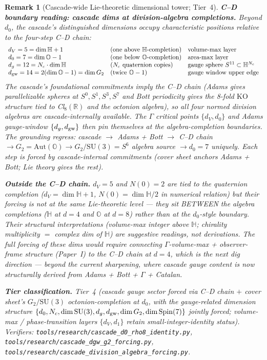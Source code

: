 \documentclass[12pt,a4paper]{article}
\newtheorem*{remark}{Remark}
\begin{document}
\begin{remark}[Cascade-wide Lie-theoretic dimensional tower; Tier~4]
\medskip\noindent\textbf{C--D boundary reading: cascade dims at division-algebra completions.} Beyond $d_0$, the cascade's distinguished dimensions occupy characteristic positions relative to the four-step C--D chain:
\[
\begin{array}{lll}
d_V = 5 = \dim\mathbb{H} + 1 & \text{(one above } \mathbb{H}\text{-completion)} & \text{volume-max layer}\\
d_0 = 7 = \dim\mathbb{O} - 1 & \text{(one below } \mathbb{O}\text{-completion)} & \text{area-max layer}\\
d_g = 12 = N_c \cdot \dim\mathbb{H} & \text{(} N_c \text{ quaternion copies)} & \text{gauge sphere $S^{11}\subset\mathbb{H}^{N_c}$}\\
d_{\rm gw} = 14 = 2(\dim\mathbb{O} - 1) = \dim G_2 & \text{(twice $\mathbb{O}-1$)} & \text{gauge window upper edge}
\end{array}
\]
The cascade's foundational commitments imply the C--D chain (Adams gives parallelizable spheres at $S^0, S^1, S^3, S^7$ and Bott periodicity gives the 8-fold $\mathrm{KO}$ structure tied to Cl$_8(\mathbb{R})$ and the octonion algebra), so all four normed division algebras are cascade-internally available. The $\Gamma$ critical points $\{d_V, d_0\}$ and Adams gauge-window $\{d_g, d_{\rm gw}\}$ then pin themselves at the algebra-completion boundaries. The grounding regress: cascade $\to$ Adams + Bott $\to$ C--D chain $\to G_2 = \mathrm{Aut}(\mathbb{O}) \to G_2/\mathrm{SU}(3) = S^6$ algebra source $\to d_0 = 7$ uniquely. Each step is forced by cascade-internal commitments (cover sheet anchors Adams + Bott; Lie theory gives the rest).

\medskip\noindent\textbf{Outside the C--D chain.} $d_V = 5$ and $N(0) = 2$ are tied to the quaternion completion ($d_V = \dim\mathbb{H} + 1$, $N(0) = \dim\mathbb{H}/2$ in numerical relation) but their forcing is not at the same Lie-theoretic level — they sit BETWEEN the algebra completions ($\mathbb{H}$ at $d=4$ and $\mathbb{O}$ at $d=8$) rather than at the $d_0$-style boundary. Their structural interpretations (volume-max integer above $\mathbb{H}$; chirality multiplicity $=$ complex dim of $\mathbb{H}$) are suggestive readings, not derivations. The full forcing of these dims would require connecting $\Gamma$-volume-max + observer-frame structure (Paper~I) to the C--D chain at $d=4$, which is the next dig direction --- beyond the current sharpening, where cascade gauge content is now structurally derived from Adams + Bott + $\Gamma$ + Catalan.

\medskip\noindent\textbf{Tier classification.} Tier~4 (cascade gauge sector forced via C--D chain $+$ cover sheet's $G_2/\mathrm{SU}(3)$ octonion-completion at $d_0$, with the gauge-related dimension structure $\{d_0, N_c, \dim\mathrm{SU}(3), d_g, d_{\rm gw}, \dim G_2, \dim\mathrm{Spin}(7)\}$ jointly forced; volume-max / phase-transition layers $\{d_V, d_1\}$ retain small-integer-identity status). Verifiers: \texttt{tools/research/cascade\_d0\_rho8\_identity.py}, \texttt{tools/research/cascade\_dgw\_g2\_forcing.py}, \texttt{tools/research/cascade\_division\_algebra\_forcing.py}.


\end{remark}
\end{document}
